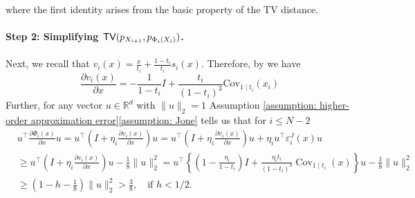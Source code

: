 \documentclass{article}
\theoremstyle{plain}
\theoremstyle{definition}
\theoremstyle{remark}
\def\cE{\mathcal{E}}
\def\TV{{\sf TV}}
\def\Cov{\text{Cov}}
\begin{document}
where the first identity arises from the basic property of the TV distance.

\paragraph{Step 2: Simplifying $\TV(p_{X_{i+1}}, p_{\Phi_i(X_i)})$.}



Next, we recall that $v_i(x) = \frac{x}{t_i} + \frac{1-t_i}{t_i} s_i(x)$. Therefore, by \citet[Lemma 13]{Liu2024_FlowNotes} we have 
\begin{equation}
\label{eq: partial v_x}
\frac{\partial v_i(x)}{\partial x} = -  \frac{1}{1-t_i} I + \frac{ t_i}{(1-t_i)^3} \Cov_{1 \mid t_i}(x_i)
\end{equation}
Further, for any vector $u \in \mathbb{R}^{d}$ with $\|u\|_{2}=1$ 
Assumption \ref{assumption: higher-order approximation error}\ref{assumption: Jone} tells us that for $i \le N-2$
$$
\begin{aligned}
& u^{\top} \frac{\partial \Phi_{i}(x)}{\partial x} u=u^{\top}\left(I+\eta_{i} \frac{\partial \widehat v_{i}(x)}{\partial x}\right) u=u^{\top}\left(I+\eta_{i} \frac{\partial v_{i}(x)}{\partial x}\right) u+\eta_{i} u^{\top} \varepsilon_{i}^{J}(x) u \\
& \geq u^{\top}\left(I+\eta_{i} \frac{\partial v_{i}(x)}{\partial x}\right) u-\frac{1}{8}\|u\|_{2}^{2}=u^{\top}\left\{\left(1-\frac{\eta_{i} }{1-t_i}\right) I+\frac{ \eta_{i} t_i}{(1-t_i)^3} \operatorname{Cov}_{1 \mid t_i}(x)\right\} u-\frac{1}{8}\|u\|_{2}^{2} \\
& \geq\left(1-h-\frac{1}{8}\right)\|u\|_{2}^{2}>\frac{3}{8} , \quad \text{if $h <  1/2$.}
\end{aligned}
$$
\end{document}

